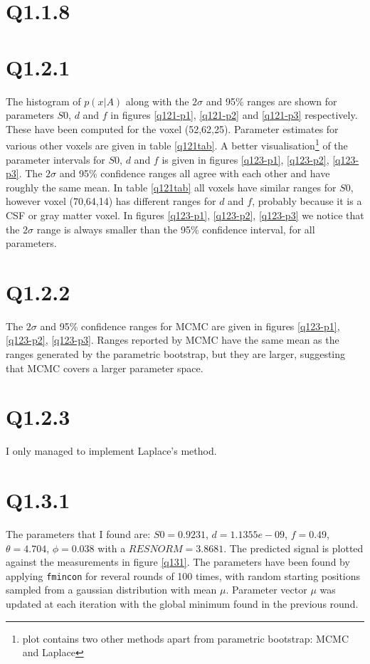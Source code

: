 \documentclass[11pt,a4paper,oneside]{report}
\begin{document}
\section*{Q1.1.8}

\section*{Q1.2.1}

The histogram of $p(x|A)$ along with the $2\sigma$ and 95\% ranges are shown for parameters $S0$, $d$ and $f$ in figures \ref{q121-p1}, \ref{q121-p2} and \ref{q121-p3} respectively. These have been computed for the voxel (52,62,25). Parameter estimates for various other voxels are given in table \ref{q121tab}. A better visualisation\footnote{plot contains two other methods apart from parametric bootstrap: MCMC and Laplace} of the parameter intervals for $S0$, $d$ and $f$  is given in figures \ref{q123-p1}, \ref{q123-p2}, \ref{q123-p3}. The $2\sigma$ and 95\% confidence ranges all agree with each other and have roughly the same mean. In table \ref{q121tab} all voxels have similar ranges for $S0$, however voxel (70,64,14) has different ranges for 
$d$ and $f$, probably because it is a CSF or gray matter voxel. In figures \ref{q123-p1}, \ref{q123-p2}, \ref{q123-p3} we notice that the $2\sigma$ range is always smaller than the 95\% confidence interval, for all parameters. 

\section*{Q1.2.2}

 The $2\sigma$ and 95\% confidence ranges for MCMC are given in figures \ref{q123-p1}, \ref{q123-p2}, \ref{q123-p3}. Ranges reported by MCMC have the same mean as the ranges generated by the parametric bootstrap, but they are larger, suggesting that MCMC covers a larger parameter space.

\section*{Q1.2.3}

I only managed to implement Laplace's method. 

\section*{Q1.3.1}

The parameters that I found are: $S0=0.9231$, $d=1.1355e-09$, $f=0.49$, $\theta=4.704$, $\phi=0.038$ with a $RESNORM=3.8681$. The predicted signal is plotted against the measurements in figure \ref{q131}. The parameters have been found by applying \texttt{fmincon} for reveral rounds of 100 times, with random starting positions sampled from a gaussian distribution with mean $\mu$. Parameter vector $\mu$ was updated at each iteration with the global minimum found in the previous round.
\end{document}
